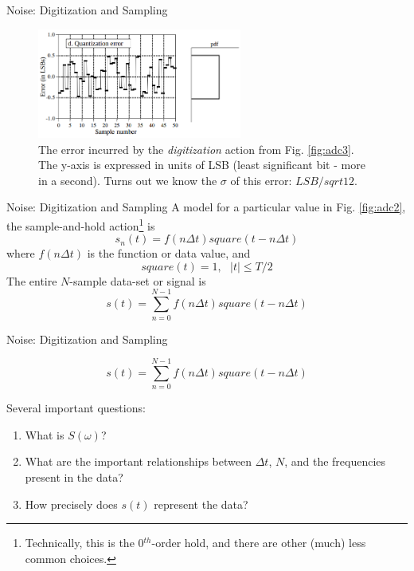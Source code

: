 \documentclass{beamer}
\begin{document}
\begin{frame}[fragile]{Noise: Digitization and Sampling}
\begin{figure}
\centering
\includegraphics[width=0.6\textwidth]{figures/adc_dac4.png}
\caption{\label{fig:adc4} The error incurred by the \textit{digitization} action from Fig. \ref{fig:adc3}.  The y-axis is expressed in units of LSB (least significant bit - more in a second). Turns out we know the $\sigma$ of this error: $LSB/sqrt{12}$.}
\end{figure}
\end{frame}

\begin{frame}[fragile]{Noise: Digitization and Sampling}
A model for a particular value in Fig. \ref{fig:adc2}, the sample-and-hold action\footnote{Technically, this is the 0$^{th}$-order hold, and there are other (much) less common choices.} is
\begin{equation}
s_n(t) = f(n\Delta t) square(t-n\Delta t)
\end{equation}
where $f(n\Delta t)$ is the function or data value, and 
\begin{equation}
square(t) = 1, ~~~ |t| \leq T/2
\end{equation}
The entire $N$-sample data-set or signal is
\begin{equation}
s(t) = \sum_{n=0}^{N-1} f(n\Delta t) square(t-n\Delta t)
\end{equation}
\end{frame}

\begin{frame}[fragile]{Noise: Digitization and Sampling}
\begin{tcolorbox}[colback=white,colframe=red!40!blue,title=Sample/Hold Signal Model]
\alert{
\begin{equation}
s(t) = \sum_{n=0}^{N-1} f(n\Delta t) square(t-n\Delta t)
\end{equation}
}
\end{tcolorbox}
Several important questions:
\begin{enumerate}
\item What is $S(\omega)$?
\item What are the important relationships between $\Delta t$, $N$, and the frequencies present in the data?
\item How precisely does $s(t)$ represent the data?
\end{enumerate}
\end{frame}
\end{document}

